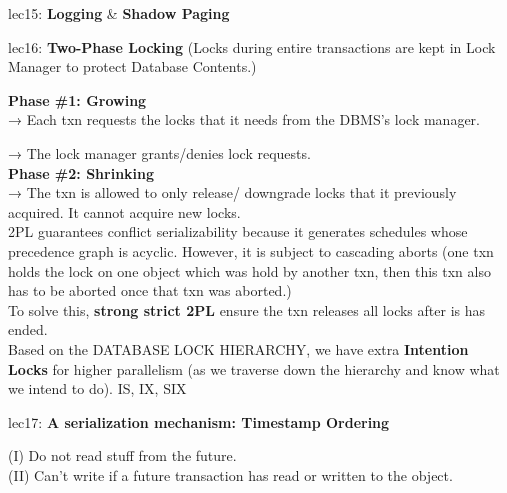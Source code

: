 \documentclass[letterpaper,11pt]{exam}
\newenvironment{indented}{\par\setlength{\parindent}{3em}}{\par}
\begin{document}
lec15: \textbf{Logging} \& \textbf{Shadow Paging} \\

\vspace*{3em}

lec16: \textbf{Two-Phase Locking} (Locks during entire transactions are kept in Lock Manager to protect Database Contents.) \\

\begin{adjustwidth}{2em}{0pt}
  \textbf{Phase \#1: Growing} \\

  → Each txn requests the locks that it needs from the DBMS's
  lock manager.
  
  → The lock manager grants/denies lock requests. \\
  
  \textbf{Phase \#2: Shrinking} \\

  → The txn is allowed to only release/ downgrade locks that it previously acquired. It cannot acquire new locks. \\
  
  2PL guarantees conflict serializability because it generates schedules whose precedence graph is acyclic. However, it is subject to cascading aborts (one txn holds the lock on one object which was hold by another txn, then this txn also has to be aborted once that txn was aborted.) \\
  
  To solve this, \textbf{strong strict 2PL} ensure the txn releases all locks after is has ended. \\
  
  Based on the DATABASE LOCK HIERARCHY, we have extra \textbf{Intention Locks} for higher parallelism (as we traverse down the hierarchy and know what we intend to do). {IS, IX, SIX}\\

\end{adjustwidth}

\vspace*{3em}
lec17: \textbf{A serialization mechanism: Timestamp Ordering} \\
\begin{adjustwidth}{2em}{0pt}
  (I) Do not read stuff from the future. \\
  (II) Can't write if a future transaction has read or written to the object. \\
\end{adjustwidth}
\end{document}
